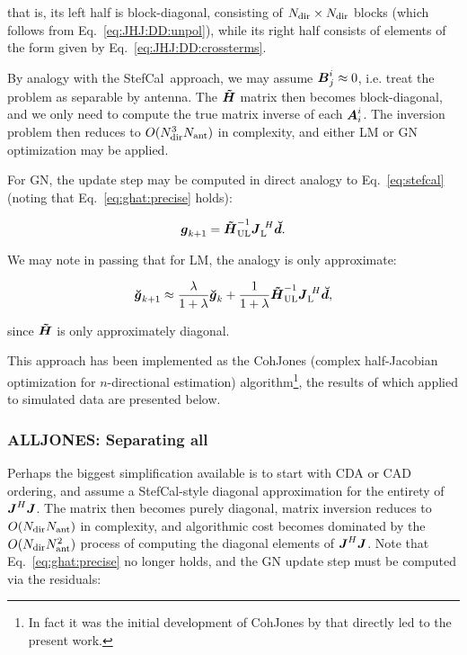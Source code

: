 \documentclass[useAMS,usenatbib]{mn2e}
\newcommand{\mat}[1]{{\bmath{#1}}}
\newcommand{\JJ}{\mat{J}} %
\newcommand{\HHa}{\mat{\tilde{H}}} %
\newcommand{\JHJ}{\JJ^H\JJ} %
\newcommand{\AUG}[1]{\bmath{\breve{#1}}}
\newcommand{\Gg}{\AUG{g}}
\newcommand{\Dd}{\AUG{d}}
\newcommand{\LEFT}{\mathrm{L}}
\newcommand{\UL}{\mathrm{UL}}%
\newcommand{\StefCal}{{\sc StefCal}}
\begin{document}
that is, its left half is block-diagonal, consisting of $N_\mathrm{dir}\times N_\mathrm{dir}$ blocks (which follows
from Eq.~\ref{eq:JHJ:DD:unpol}), while its right half consists of elements of the form given by
Eq.~\ref{eq:JHJ:DD:crossterms}. 

By analogy with the \StefCal\ approach, we may assume $\JJY^i_j \approx 0$, i.e. treat the problem as
separable by antenna. The $\HHa$ matrix then becomes block-diagonal, and we only need to compute the 
true matrix inverse of each $\JJX^i_i$. The inversion problem then reduces to $O(N_\mathrm{dir}^3N_\mathrm{ant})$ in complexity,
and either LM or GN optimization may be applied.

For GN, the update step may be computed in direct analogy to Eq.~\ref{eq:stefcal} (noting that Eq.~\ref{eq:ghat:precise}
holds):

\[
\bmath{g}_{k+1} = \HHa_\UL^{-1} \JJ_\LEFT^{~H} \Dd.
\]

We may note in passing that for LM, the analogy is only approximate:

\[
\Gg_{k+1} \approx \frac{\lambda}{1+\lambda}\Gg_k + \frac{1}{1+\lambda} \HHa_\UL^{-1} \JJ_\LEFT^{~H} \Dd,
\]

since $\HHa$ is only approximately diagonal.

This approach has been implemented as the {\sc CohJones} (complex half-Jacobian optimization for $n$-directional estimation) 
algorithm\footnote{In fact it was the initial development of {\sc CohJones} by \citet{Tasse-cohjones} that directly led to the
present work.}, the results of which applied to simulated data are presented below.


\subsubsection{ALLJONES: Separating all}

Perhaps the biggest simplification available is to start with CDA or CAD ordering, and assume a \StefCal-style diagonal 
approximation for the entirety of $\JHJ$. The matrix then becomes purely diagonal, matrix inversion reduces to $O(N_\mathrm{dir}N_\mathrm{ant})$ in 
complexity, and algorithmic cost becomes dominated by the $O(N_\mathrm{dir}N_\mathrm{ant}^2)$ process of computing the diagonal elements of 
$\JHJ$. Note that Eq.~\ref{eq:ghat:precise} no longer holds, and the GN update step must be computed via the residuals:
\end{document}
